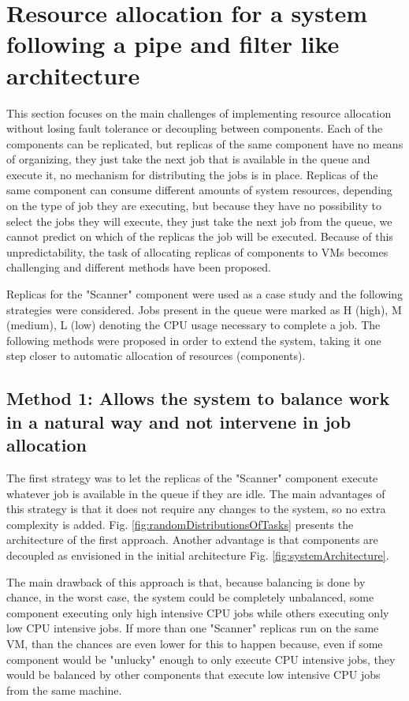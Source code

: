 \section{Resource allocation for a system following a pipe and filter like architecture}
This section focuses on the main challenges of implementing resource allocation without losing fault tolerance or decoupling between components. Each of the components can be replicated, but replicas of the same component have no means of organizing, they just take the next job that is available in the queue and execute it, no mechanism for distributing the jobs is in place. Replicas of the same component can consume different amounts of system resources, depending on the type of job they are executing, but because they have no possibility to select the jobs they will execute, they just take the next job from the queue, we cannot predict on which of the replicas the job will be executed. Because of this unpredictability, the task of allocating replicas of components to VMs becomes challenging and different methods have been proposed.

Replicas for the "Scanner" component were used as a case study and the following strategies were considered. Jobs present in the queue were marked as H (high), M (medium), L (low) denoting the CPU usage necessary to complete a job. The following methods were proposed in order to extend the system, taking it one step closer to automatic allocation of resources (components).

\subsection{Method 1: Allows the system to balance work in a natural way and not intervene in job allocation}
\label{subsection:method1}
The first strategy was to let the replicas of the "Scanner" component execute whatever job is available in the queue if they are idle. The main advantages of this strategy is that it does not require any changes to the system, so no extra complexity is added. Fig. \ref{fig:randomDistributionsOfTasks} presents the architecture of the first approach. Another advantage is that components are decoupled as envisioned in the initial architecture Fig. \ref{fig:systemArchitecture}.

The main drawback of this approach is that, because balancing is done by chance, in the worst case, the system could be completely unbalanced, some component executing only high intensive CPU jobs while others executing only low CPU intensive jobs. If more than one "Scanner" replicas run on the same VM, than the chances are even lower for this to happen because, even if some component would be "unlucky" enough to only execute CPU intensive jobs, they would be balanced by other components that execute low intensive CPU jobs from the same machine.

